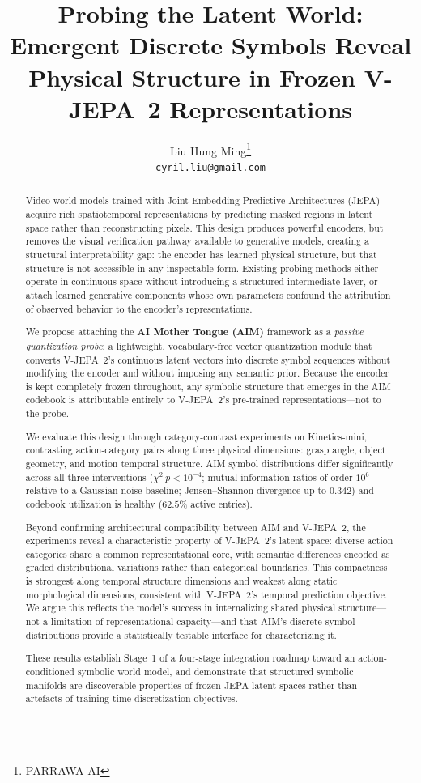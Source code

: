 \documentclass{article}
\title{Probing the Latent World: Emergent Discrete Symbols Reveal
Physical Structure in Frozen V-JEPA~2 Representations}
\author{Liu Hung Ming\thanks{PARRAWA AI} \\ \texttt{cyril.liu@gmail.com}}
\begin{document}
\maketitle

\begin{abstract}
Video world models trained with Joint Embedding Predictive
Architectures (JEPA) acquire rich spatiotemporal representations by
predicting masked regions in latent space rather than reconstructing
pixels.
This design produces powerful encoders, but removes the visual
verification pathway available to generative models, creating a
structural interpretability gap: the encoder has learned physical
structure, but that structure is not accessible in any inspectable
form.
Existing probing methods either operate in continuous space without
introducing a structured intermediate layer, or attach learned
generative components whose own parameters confound the attribution
of observed behavior to the encoder's representations.

We propose attaching the \textbf{AI Mother Tongue (AIM)} framework as
a \emph{passive quantization probe}: a lightweight, vocabulary-free
vector quantization module that converts V-JEPA~2's continuous latent
vectors into discrete symbol sequences without modifying the encoder
and without imposing any semantic prior.
Because the encoder is kept completely frozen throughout, any symbolic
structure that emerges in the AIM codebook is attributable entirely to
V-JEPA~2's pre-trained representations---not to the probe.

We evaluate this design through category-contrast experiments on Kinetics-mini, contrasting action-category pairs along
three physical dimensions: grasp angle, object geometry, and motion
temporal structure.
AIM symbol distributions differ significantly across all three
interventions ($\chi^2\ p < 10^{-4}$; mutual information ratios of
order $10^6$ relative to a Gaussian-noise baseline; Jensen--Shannon
divergence up to $0.342$) and codebook utilization is healthy
($62.5\%$ active entries).

Beyond confirming architectural compatibility between AIM and
V-JEPA~2, the experiments reveal a characteristic property of
V-JEPA~2's latent space: diverse action categories share a common
representational core, with semantic differences encoded as graded
distributional variations rather than categorical boundaries.
This compactness is strongest along temporal structure dimensions and
weakest along static morphological dimensions, consistent with
V-JEPA~2's temporal prediction objective.
We argue this reflects the model's success in internalizing shared
physical structure---not a limitation of representational
capacity---and that AIM's discrete symbol distributions provide a
statistically testable interface for characterizing it.

These results establish Stage~1 of a four-stage integration roadmap
toward an action-conditioned symbolic world model, and demonstrate
that structured symbolic manifolds are discoverable properties of
frozen JEPA latent spaces rather than artefacts of training-time
discretization objectives.
\end{abstract}
\end{document}
